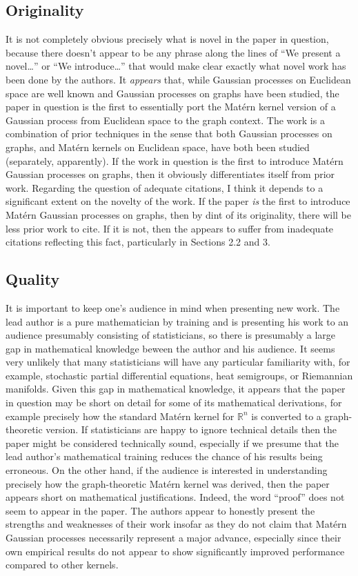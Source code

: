 \subsection{Originality}

It is not completely obvious precisely what is novel in the paper in question, because there doesn't appear to be any phrase along the lines of ``We present a novel\dots'' or ``We introduce\dots'' that would make clear exactly what novel work has been done by the authors. It \textit{appears} that, while Gaussian processes on Euclidean space are well known and Gaussian processes on graphs have been studied, the paper in question is the first to essentially port the Mat\'{e}rn kernel version of a Gaussian process from Euclidean space to the graph context. The work is a combination of prior techniques in the sense that both Gaussian processes on graphs, and Mat\'{e}rn kernels on Euclidean space, have both been studied (separately, apparently). If the work in question is the first to introduce Mat\'{e}rn Gaussian processes on graphs, then it obviously differentiates itself from prior work. Regarding the question of adequate citations, I think it depends to a significant extent on the novelty of the work. If the paper \textit{is} the first to introduce Mat\'{e}rn Gaussian processes on graphs, then by dint of its originality, there will be less prior work to cite. If it is not, then the appears to suffer from inadequate citations reflecting this fact, particularly in Sections 2.2 and 3.

\subsection{Quality}

It is important to keep one's audience in mind when presenting new work. The lead author is a pure mathematician by training and is presenting his work to an audience presumably consisting of statisticians, so there is presumably a large gap in mathematical knowledge beween the author and his audience. It seems very unlikely that many statisticians will have any particular familiarity with, for example, stochastic partial differential equations, heat semigroups, or Riemannian manifolds. Given this gap in mathematical knowledge, it appears that the paper in question may be short on detail for some of its mathematical derivations, for example precisely how the standard Mat\'{e}rn kernel for $\mathbb R^n$ is converted to a graph-theoretic version. If statisticians are happy to ignore technical details then the paper might be considered technically sound, especially if we presume that the lead author's mathematical training reduces the chance of his results being erroneous. On the other hand, if the audience is interested in understanding precisely how the graph-theoretic Mat\'{e}rn kernel was derived, then the paper appears short on mathematical justifications. Indeed, the word ``proof'' does not seem to appear in the paper. The authors appear to honestly present the strengths and weaknesses of their work insofar as they do not claim that Mat\'{e}rn Gaussian processes necessarily represent a major advance, especially since their own empirical results do not appear to show significantly improved performance compared to other kernels.

